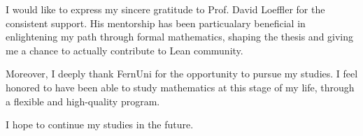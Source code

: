 \documentclass[12pt,a4paper]{book}
\numberwithin{figure}{theorem}
\begin{document}
\begin{acknowledgments}
    I would like to express my sincere gratitude to Prof. David Loeffler for
    the consistent support.
    His mentorship has been particualary beneficial in enlightening my path through
    formal mathematics, shaping the thesis and giving me a chance to
    actually contribute to Lean community.

    Moreover, I deeply thank FernUni for the opportunity to pursue my
    studies. I feel honored to have been able to study
    mathematics at this stage of my life, through a flexible and
    high-quality program.

    I hope to continue my studies in the future.
\end{acknowledgments}

\tableofcontents








\printbibliography
\end{document}
